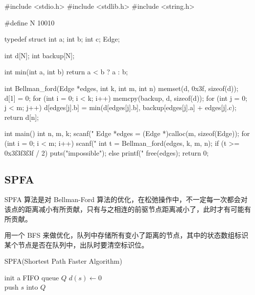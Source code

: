 \begin{mycpptwocol}
    #include <stdio.h>
    #include <stdlib.h>
    #include <string.h>

    #define N 10010

    typedef struct {
        int a;
        int b;
        int c;
    } Edge;

    int d[N];
    int backup[N];

    int min(int a, int b) {
        return a < b ? a : b;
    }

    int Bellman_ford(Edge *edges, int k, int m, int n) {
        memset(d, 0x3f, sizeof(d));
        d[1] = 0;
        for (int i = 0; i < k; i++) {
            memcpy(backup, d, sizeof(d));
            for (int j = 0; j < m; j++) {
                d[edges[j].b] = min(d[edges[j].b], backup[edges[j].a] + edges[j].c);
            }
        }
        return d[n];
    }

    int main() {
        int n, m, k;
        scanf("%
        Edge *edges = (Edge *)calloc(m, sizeof(Edge));
        for (int i = 0; i < m; i++) {
            scanf("%
        }
        int t = Bellman_ford(edges, k, m, n);
        if (t >= 0x3f3f3f3f / 2) {
            puts("impossible");
        } else {
            printf("%
        }
        free(edges);
        return 0;
    }
\end{mycpptwocol}

\subsection{SPFA}
SPFA 算法是对 Bellman-Ford 算法的优化，在松弛操作中，不一定每一次都会对该点的距离减小有所贡献，只有与之相连的前驱节点距离减小了，此时才有可能有所贡献。

用一个 BFS 来做优化，队列中存储所有变小了距离的节点，其中的状态数组标识某个节点是否在队列中，出队时要清空标识位。

\begin{algorithm}[H] %
    \caption{SPFA(Shortest Path Faster Algorithm)}
    \SetAlgoLined
    init a FIFO queue $Q$\;
    $d(s) \leftarrow 0$\\
    push $s$ into $Q$\\
\end{algorithm}

